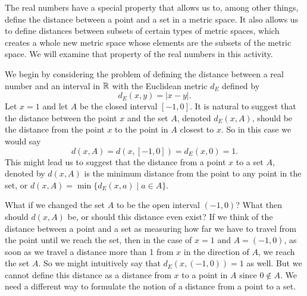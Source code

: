\label{chap:glb}


\vspace*{-17 pt}

\vspace*{13 pt}

\label{sec_glb_intro}

The real numbers have a special property that allows us to, among other things, define the distance between a point and a set in a metric space. It also allows us to define distances between subsets of certain types of metric spaces, which creates a whole new metric space whose elements are the subsets of the metric space. We will examine that property of the real numbers in this activity. 

We begin by considering the problem of defining the distance between a real number and an interval in $\mathbb{R}$ with the Euclidean metric $d_E$ defined by 
\[d_E(x,y) = | x-y |.\]
Let $x = 1$ and let $A$ be the closed interval $[-1,0]$. It is natural to suggest that the distance between the point $x$ and the set $A$, denoted $d_E(x,A)$, should be the distance from the point $x$ to the point in $A$ closest to $x$. So in this case we would say 
\[d(x,A) = d(x,[-1,0]) = d_E(x,0) = 1.\]
This might lead us to suggest that the distance from a point $x$ to a set $A$, denoted by $d(x,A)$ is the minimum distance from the point to any point in the set, or $d(x,A) = \min\{d_E(x,a) \mid a \in A\}$. 

What if we changed the set $A$ to be the open interval $(-1,0)$? What then should $d(x,A)$ be, or should this distance even exist? If we think of the distance between a point and a set as measuring how far we have to travel from the point until we reach the set, then in the case of $x=1$ and $A=(-1,0)$, as soon as we travel a distance more than 1 from $x$ in the direction of $A$, we reach the set $A$. So we might intuitively say that $d_E(x,(-1,0)) = 1$ as well. But we cannot define this distance as a distance from $x$ to a point in $A$ since $0 \notin A$. We need a different way to formulate the notion of a distance from a point to a set.

